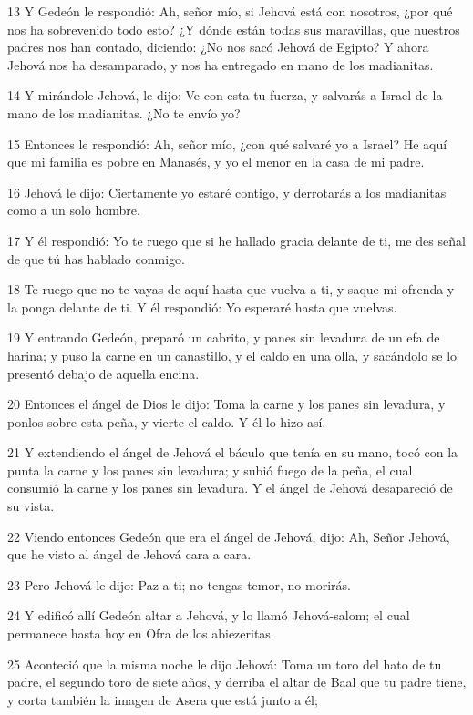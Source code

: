 \par 13 Y Gedeón le respondió: Ah, señor mío, si Jehová está con nosotros, ¿por qué nos ha sobrevenido todo esto? ¿Y dónde están todas sus maravillas, que nuestros padres nos han contado, diciendo: ¿No nos sacó Jehová de Egipto? Y ahora Jehová nos ha desamparado, y nos ha entregado en mano de los madianitas.
\par 14 Y mirándole Jehová, le dijo: Ve con esta tu fuerza, y salvarás a Israel de la mano de los madianitas. ¿No te envío yo?
\par 15 Entonces le respondió: Ah, señor mío, ¿con qué salvaré yo a Israel? He aquí que mi familia es pobre en Manasés, y yo el menor en la casa de mi padre.
\par 16 Jehová le dijo: Ciertamente yo estaré contigo, y derrotarás a los madianitas como a un solo hombre.
\par 17 Y él respondió: Yo te ruego que si he hallado gracia delante de ti, me des señal de que tú has hablado conmigo.
\par 18 Te ruego que no te vayas de aquí hasta que vuelva a ti, y saque mi ofrenda y la ponga delante de ti. Y él respondió: Yo esperaré hasta que vuelvas.
\par 19 Y entrando Gedeón, preparó un cabrito, y panes sin levadura de un efa   de harina; y puso la carne en un canastillo, y el caldo en una olla, y sacándolo se lo presentó debajo de aquella encina.
\par 20 Entonces el ángel de Dios le dijo: Toma la carne y los panes sin levadura, y ponlos sobre esta peña, y vierte el caldo. Y él lo hizo así.
\par 21 Y extendiendo el ángel de Jehová el báculo que tenía en su mano, tocó con la punta la carne y los panes sin levadura; y subió fuego de la peña, el cual consumió la carne y los panes sin levadura. Y el ángel de Jehová desapareció de su vista.
\par 22 Viendo entonces Gedeón que era el ángel de Jehová, dijo: Ah, Señor Jehová, que he visto al ángel de Jehová cara a cara. 
\par 23 Pero Jehová le dijo: Paz a ti; no tengas temor, no morirás.
\par 24 Y edificó allí Gedeón altar a Jehová, y lo llamó Jehová-salom; el cual permanece hasta hoy en Ofra de los abiezeritas.
\par 25 Aconteció que la misma noche le dijo Jehová: Toma un toro del hato de tu padre, el segundo toro de siete años, y derriba el altar de Baal que tu padre tiene, y corta también la imagen de Asera que está junto a él;

